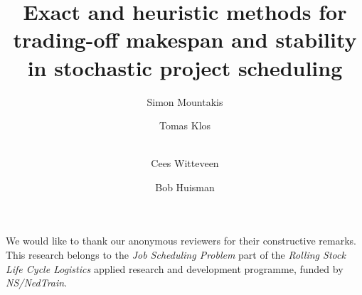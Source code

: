 	\newcommand{\xE}{\mathcal{E}}
	\newcommand{\xS}{\boldsymbol{S}}
	\newcommand{\xX}{\boldsymbol{X}}
	\newcommand{\xP}{\boldsymbol{\Pi}}
	\newtheorem{edit}{Edit}	
	\newtheorem{TODO}{TODO}
	
	\setcounter{tocdepth}{3}
	
	
	\title{Exact and heuristic methods for trading-off makespan and stability in stochastic project scheduling} 
	\subtitle{}
	
	\author{Simon Mountakis \and
	        Tomas Klos \and \\
	        Cees Witteveen \and
	        Bob Huisman
	}

	
	\maketitle
	
	\begin{abstract}
	
 	\end{abstract}
	
	
	
	
	 
	
	
	
 	
 	
 	
	\begin{acknowledgements}
	We would like to thank our anonymous reviewers for their constructive remarks.
	This research belongs to the \emph{Job Scheduling Problem} part of the 
	\emph{Rolling Stock Life Cycle Logistics} applied research and development programme, 
	funded by \emph{NS/NedTrain}.
	\end{acknowledgements}
	
